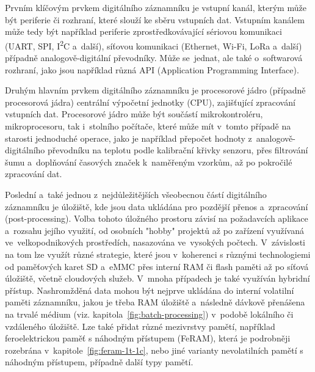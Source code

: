 Prvním klíčovým prvkem digitálního záznamníku je vstupní kanál, kterým může být periferie či rozhraní, které slouží ke sběru vstupních dat. Vstupním kanálem může tedy být například periferie zprostředkovávající sériovou komunikaci (UART, SPI, I\textsuperscript{2}C a~další), síťovou komunikaci (Ethernet, Wi-Fi, LoRa a~další) případně analogově-digitální převodníky. Může se~jednat, ale také o~softwarová rozhraní, jako jsou například různá API (Application Programming Interface).~\cite{ researchgate_general_dataloggger_multiple_sdcards, ieee_digital_sound_recorder_arm_sd_card}

Druhým hlavním prvkem digitálního záznamníku je procesorové jádro (případně procesorová jádra) centrální výpočetní jednotky (CPU), zajišťující zpracování vstupních dat. Procesorové jádro může být součástí mikrokontroléru, mikroprocesoru, tak i~stolního počítače, které může mít v~tomto případě na starosti jednoduché operace, jako je například přepočet hodnoty z~analogově-digitálního převodníku na teplotu podle kalibrační křivky senzoru, přes filtrování šumu a~doplňování časových značek k~naměřeným vzorkům, až po pokročilé zpracování dat.~\cite{smart_datalogger_data_acquisition_cpu, researchgate_general_dataloggger_multiple_sdcards, springer_development_ECG_recorder}

\newpage

Poslední a~také jednou z~nejdůležitějších všeobecnou částí digitálního záznamníku je úložiště, kde jsou data ukládána pro pozdější přenos a~zpracování (post-processing). Volba tohoto úložného prostoru závisí na požadavcích aplikace a~rozsahu jejího využití, od osobních "hobby" projektů až po zařízení využívaná ve~velkopodnikových prostředích, nasazována ve~vysokých počtech. V~závislosti na tom lze využít různé strategie, které jsou v~koherenci s různými technologiemi od paměťových karet SD a~eMMC přes interní RAM či flash paměti až po síťová úložiště, včetně cloudových služeb. V~mnoha případech je také využíván hybridní přístup. Nashromžděná data mohou být nejprve ukládána do interní volatilní paměti záznamníku, jakou je třeba RAM úložiště a~následně dávkově přenášena na trvalé médium (viz. kapitola~\ref{fig:batch-processing}) v~podobě lokálního či vzdáleného úložiště. Lze také přidat různé mezivrstvy pamětí, například feroelektrickou paměť s náhodným přístupem (FeRAM), která je podrobněji rozebrána v~kapitole~\ref{fig:feram-1t-1c}, nebo jiné varianty nevolatilních pamětí s náhodným přístupem, případně další typy pamětí.~\cite{datalogger_sd_mmc_usb_flash_disk, researchgate_general_dataloggger_multiple_sdcards, rta_local_vs_cloud}

